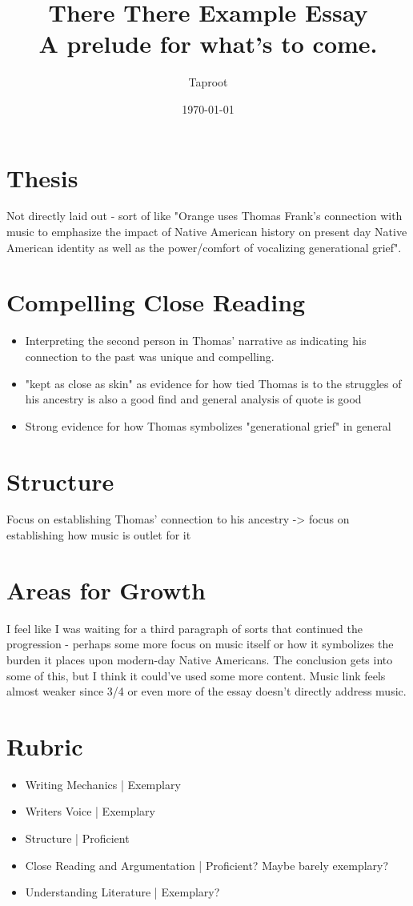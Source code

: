 \documentclass[letterpaper]{article}
\author{Taproot}
\date{\today}
\title{There There Example Essay\\\medskip
\large A prelude for what's to come.}
\renewcommand{\tableofcontents}{}
\begin{document}
\tableofcontents


\section{Thesis}
\label{sec:org2fba70e}
Not directly laid out - sort of like "Orange uses Thomas Frank's connection with music to emphasize the impact of Native American history on present day Native American identity as well as the power/comfort of vocalizing generational grief". 

\section{Compelling Close Reading}
\label{sec:org33ccce6}
\begin{itemize}
\item Interpreting the second person in Thomas' narrative as indicating his connection to the past was unique and compelling.
\item "kept as close as skin" as evidence for how tied Thomas is to the struggles of his ancestry is also a good find and general analysis of quote is good
\item Strong evidence for how Thomas symbolizes "generational grief" in general
\end{itemize}

\section{Structure}
\label{sec:org38cbcea}
Focus on establishing Thomas' connection to his ancestry -> focus on establishing how music is outlet for it

\section{Areas for Growth}
\label{sec:org8215679}
I feel like I was waiting for a third paragraph of sorts that continued the progression - perhaps some more focus on music itself or how it symbolizes the burden it places upon modern-day Native Americans. The conclusion gets into some of this, but I think it could've used some more content. Music link feels almost weaker since 3/4 or even more of the essay doesn't directly address music.

\section{Rubric}
\label{sec:orgf7e76b7}
\begin{itemize}
\item Writing Mechanics | Exemplary
\item Writers Voice | Exemplary
\item Structure | Proficient
\item Close Reading and Argumentation | Proficient? Maybe barely exemplary?
\item Understanding Literature | Exemplary?
\end{itemize}
\end{document}
